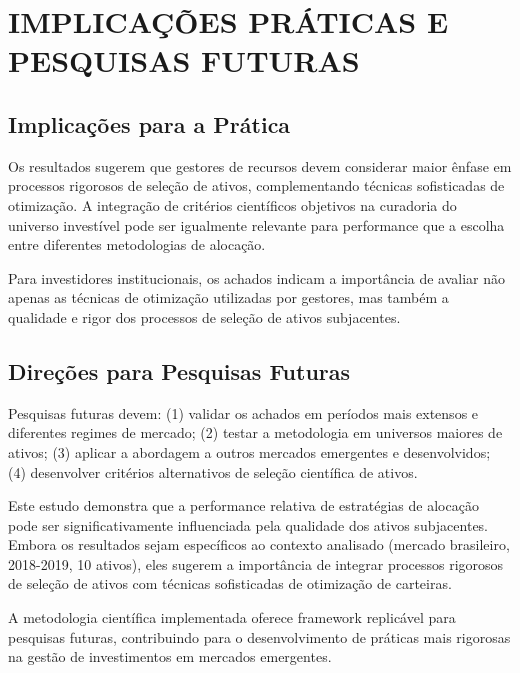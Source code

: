 \section{IMPLICAÇÕES PRÁTICAS E PESQUISAS FUTURAS}

\subsection{Implicações para a Prática}

Os resultados sugerem que gestores de recursos devem considerar maior ênfase em processos rigorosos de seleção de ativos, complementando técnicas sofisticadas de otimização. A integração de critérios científicos objetivos na curadoria do universo investível pode ser igualmente relevante para performance que a escolha entre diferentes metodologias de alocação.

Para investidores institucionais, os achados indicam a importância de avaliar não apenas as técnicas de otimização utilizadas por gestores, mas também a qualidade e rigor dos processos de seleção de ativos subjacentes.

\subsection{Direções para Pesquisas Futuras}

Pesquisas futuras devem: (1) validar os achados em períodos mais extensos e diferentes regimes de mercado; (2) testar a metodologia em universos maiores de ativos; (3) aplicar a abordagem a outros mercados emergentes e desenvolvidos; (4) desenvolver critérios alternativos de seleção científica de ativos.

Este estudo demonstra que a performance relativa de estratégias de alocação pode ser significativamente influenciada pela qualidade dos ativos subjacentes. Embora os resultados sejam específicos ao contexto analisado (mercado brasileiro, 2018-2019, 10 ativos), eles sugerem a importância de integrar processos rigorosos de seleção de ativos com técnicas sofisticadas de otimização de carteiras.

A metodologia científica implementada oferece framework replicável para pesquisas futuras, contribuindo para o desenvolvimento de práticas mais rigorosas na gestão de investimentos em mercados emergentes.